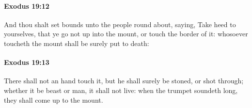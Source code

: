 		\paragraph{Exodus 19:12} %
			\label{EXODUS-19-12}

			And thou shalt set bounds unto the people round about, saying, Take heed to yourselves, that ye go not up into the mount, or touch the border of it: whosoever toucheth the mount shall be surely put to death:


		\paragraph{Exodus 19:13} %
			\label{EXODUS-19-13}

			There shall not an hand touch it, but he shall surely be stoned, or shot through; whether it be beast or man, it shall not live: when the trumpet soundeth long, they shall come up to the mount.

